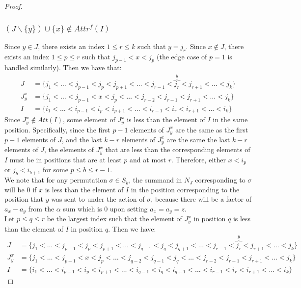 \documentclass[12 pt]{article}
\theoremstyle{plain}
\theoremstyle{plain}
\theoremstyle{plain}
\theoremstyle{plain}
\theoremstyle{plain}
\theoremstyle{plain}
\theoremstyle{plain}
\theoremstyle{plain}
\theoremstyle{plain}
\theoremstyle{plain}
\theoremstyle{remark}
\theoremstyle{remark}
\theoremstyle{definition}
\theoremstyle{definition}
\theoremstyle{definition}
\theoremstyle{definition}
\theoremstyle{definition}
\theoremstyle{definition}
\begin{document}
\begin{proof}
\subsubsection{$(J\backslash\{y\})\cup\{x\}\notin Attr^{f}(I)$}
Since $y \in J$, there exists an index $1 \leq r \leq k$ such that $y = j_r$. Since $x \not\in J$, there exists an index $1 \leq p \leq r$ such that $j_{p-1} < x < j_p$ (the edge case of $p = 1$ is handled similarly). Then we have that:
\begin{align*}
J &= \{j_1 < \ldots < j_{p-1} < j_p < j_{p+1} < \ldots < j_{r-1} < \overbrace{j_r}^{y} < j_{r+1} < \ldots < j_k\}\\
J_y^x &= \{j_1 < \ldots < j_{p-1} < x< j_p < \ldots < j_{r-2} < j_{r-1} < j_{r+1} < \ldots < j_k\}\\
I &= \{i_1 < \ldots < i_{p-1} < i_p < i_{p+1} < \ldots < i_{r-1} < i_r < i_{r+1} < \ldots < i_k\}
\end{align*}
Since $J_y^x \not\in Att(I)$, some element of $J_{y}^{x}$ is less than the element of $I$ in the same position. Specifically, since the first $p-1$ elements of $J_{y}^{x}$ are the same as the first $p-1$ elements of $J$, and the last $k-r$ elements of $J_{y}^{x}$ are the same the last $k-r$ elements of $J$, the elements of $J_{y}^{x}$ that are less than the corresponding elements of $I$ must be in positions that are at least $p$ and  at most $r$. Therefore, either $x < i_p$ or $j_{b} < i_{b+1}$ for some $p \leq b \leq r-1$.\\ We note that for any permutation $\sigma \in S_k$, the summand in $N_J$ corresponding to $\sigma$ will be 0 if $x$ is less than the element of $I$ in the position corresponding to the position that $y$ was sent to under the action of $\sigma$, because there will be a factor of $a_x - a_y$ from the $\alpha$ sum which is 0 upon setting $a_x = a_y = z$.\\
Let $p \leq q \leq r$ be the largest index such that the element of $J_y^x$ in position $q$ is less than the element of $I$ in position $q$. Then we have:
\begin{align*}
J &= \{j_1 < \ldots < j_{p-1} < j_p < j_{p+1} < \ldots < j_{q-1} < j_q < j_{q+1} < \ldots < j_{r-1} < \overbrace{j_r}^{y} < j_{r+1} < \ldots < j_k\}\\
J_y^x &= \{j_1 < \ldots < j_{p-1} < x< j_p < \ldots < j_{q-2} < j_{q-1} < j_{q} < \ldots < j_{r-2} < j_{r-1} < j_{r+1} < \ldots < j_k\}\\
I &= \{i_1 < \ldots < i_{p-1} < i_p < i_{p+1} < \ldots < i_{q-1} < i_q < i_{q+1} < \ldots < i_{r-1} < i_r < i_{r+1} < \ldots < i_k\}

\end{align*}
\end{proof}
\end{document}
